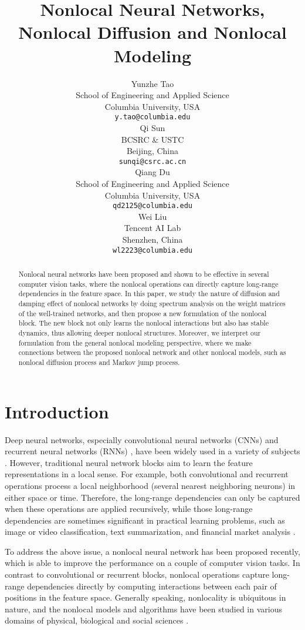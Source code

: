 \documentclass{article}
\title{Nonlocal Neural Networks, Nonlocal Diffusion and Nonlocal Modeling}
\author{
  Yunzhe Tao \\
  School of Engineering and Applied Science\\
  Columbia University, USA\\
  \texttt{y.tao@columbia.edu} \\
   \And
   Qi Sun \\
  BCSRC \& USTC \\
  Beijing, China \\
   \texttt{sunqi@csrc.ac.cn} \\
   \AND
   Qiang Du \\
  School of Engineering and Applied Science\\
  Columbia University, USA\\
   \texttt{qd2125@columbia.edu} \\
   \And
   Wei Liu \\
   Tencent AI Lab \\
   Shenzhen, China \\
   \texttt{wl2223@columbia.edu} \\
}
\begin{document}

\maketitle

\begin{abstract}
Nonlocal neural networks \cite{wang2017non} have been proposed and shown to be effective in several computer vision tasks, where the nonlocal operations can directly capture long-range dependencies in the feature space. In this paper, we study the nature of diffusion and damping effect of nonlocal networks by doing spectrum analysis on the weight matrices of the well-trained networks, and then propose a new formulation of the nonlocal block. The new block not only learns the nonlocal interactions but also has stable dynamics, thus allowing deeper nonlocal structures. Moreover, we interpret our formulation from the general nonlocal modeling perspective, where we make connections between the proposed nonlocal network and other nonlocal models, such as nonlocal diffusion process and Markov jump process.
\end{abstract}

\section{Introduction}\label{sec:intro}
Deep neural networks, especially convolutional neural networks (CNNs) \cite{lecun1995convolutional} and recurrent neural networks (RNNs) \cite{elman1991distributed}, have been widely used in a variety of subjects \cite{lecun2015deep}. However, traditional neural network blocks aim to learn the feature representations in a local sense. For example, both convolutional and recurrent operations process a local neighborhood (several nearest neighboring neurons) in either space or time. Therefore, the long-range dependencies can only be captured when these operations are applied recursively, while those long-range dependencies are sometimes significant in practical learning problems, such as image or video classification, text summarization, and financial market analysis \cite{beran1995long,cont2005long,pipiras2017long,willinger2003long}.

To address the above issue, a nonlocal neural network \cite{wang2017non} has been proposed recently, which is able to improve the performance on a couple of computer vision tasks. In contrast to convolutional or recurrent blocks, nonlocal operations \cite{wang2017non} capture long-range dependencies directly by computing interactions between each pair of positions in the feature space. Generally speaking, nonlocality is ubiquitous in nature, and the nonlocal models and algorithms have been studied in various domains of physical, biological and social sciences \cite{ buades2005non, coifman2006diffusion, du2012analysis,silling2000reformulation,tadmor2015mathematical}.
\end{document}

